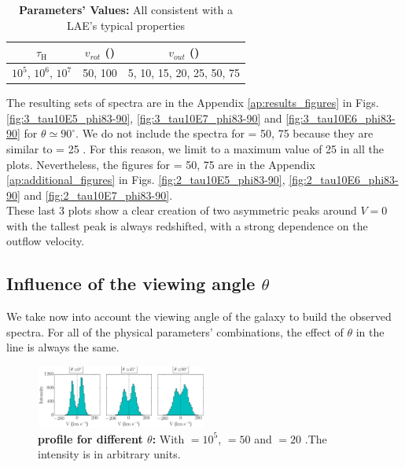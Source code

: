 \documentclass[twocolappendix]{latex/emulateapj}
\begin{document}
\begin{table}[htbp]
	\centering
	\begin{tabular}{|c|c|c|}
		\hline
		$\tau_{\mathrm{H}}$ & $v_{rot}$ (\kms) & $v_{out}$ (\kms) \\
		\hline
		$10^5$, $10^6$, $10^7$ & 50, 100 & 5, 10, 15, 20, 25, 50, 75 \\
		\hline
	\end{tabular}
	\caption{\textbf{Parameters' Values:} All consistent with a LAE's typical properties}
	\label{tab:values}
\end{table}

The resulting sets of spectra are in the Appendix \ref{ap:results_figures} in Figs. \ref{fig:3_tau10E5_phi83-90}, \ref{fig:3_tau10E7_phi83-90} and \ref{fig:3_tau10E6_phi83-90} for $\theta \simeq 90^\circ$. We do not include the spectra for \vout = 50, 75 \kms because they are similar to \vout = 25 \kms. For this reason, we limit \vout to a maximum value of 25 \kms in all the plots. Nevertheless, the figures for \vout = 50, 75 \kms are in the Appendix \ref{ap:additional_figures} in Figs. \ref{fig:2_tau10E5_phi83-90}, \ref{fig:2_tau10E6_phi83-90} and \ref{fig:2_tau10E7_phi83-90}.\\

These last 3 plots show a clear creation of two asymmetric peaks around $V=0$ \kms with the tallest peak is always redshifted, with a strong dependence on the outflow velocity.\\

\subsection{Influence of the viewing angle $\theta$}
We take now into account the viewing angle of the galaxy to build the observed spectra. For all of the physical parameters' combinations, the effect of $\theta$ in the \lya line is always the same.\\

\begin{figure}[h!]
	\begin{center}
		\includegraphics[width=0.5\textwidth]{./figures/influence_viewing_angle_5}
	\end{center}
	\caption{\textbf{\lya profile for different $\theta$:} With \tauh$=10^5$, \vrot$=50$ \kms and \vout$=20$ \kms.The intensity is in arbitrary units.
		\label{fig:influence_viewing_angle_5}}
\end{figure}
\end{document}
